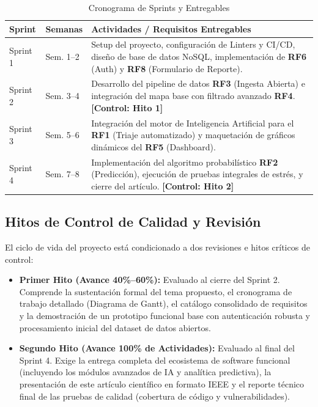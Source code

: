 \documentclass[conference]{IEEEtran}
\begin{document}
\begin{table}[htbp]
\caption{Cronograma de Sprints y Entregables}
\label{tab:cronograma}
\begin{center}
\begin{tabular}{llp{4.7cm}}
\toprule
\textbf{Sprint} & \textbf{Semanas} & \textbf{Actividades / Requisitos Entregables} \\ \midrule
Sprint 1 & Sem. 1--2 & Setup del proyecto, configuración de Linters y CI/CD, diseño de base de datos NoSQL, implementación de \textbf{RF6} (Auth) y \textbf{RF8} (Formulario de Reporte). \\ \addlinespace
Sprint 2 & Sem. 3--4 & Desarrollo del pipeline de datos \textbf{RF3} (Ingesta Abierta) e integración del mapa base con filtrado avanzado \textbf{RF4}. \textbf{[Control: Hito 1]} \\ \addlinespace
Sprint 3 & Sem. 5--6 & Integración del motor de Inteligencia Artificial para el \textbf{RF1} (Triaje automatizado) y maquetación de gráficos dinámicos del \textbf{RF5} (Dashboard). \\ \addlinespace
Sprint 4 & Sem. 7--8 & Implementación del algoritmo probabilístico \textbf{RF2} (Predicción), ejecución de pruebas integrales de estrés, y cierre del artículo. \textbf{[Control: Hito 2]} \\
\bottomrule
\end{tabular}
\end{center}
\end{table}

\subsection{Hitos de Control de Calidad y Revisión}
El ciclo de vida del proyecto está condicionado a dos revisiones e hitos críticos de control:
\begin{itemize}
    \item \textbf{Primer Hito (Avance 40\%--60\%):} Evaluado al cierre del Sprint 2. Comprende la sustentación formal del tema propuesto, el cronograma de trabajo detallado (Diagrama de Gantt), el catálogo consolidado de requisitos y la demostración de un prototipo funcional base con autenticación robusta y procesamiento inicial del dataset de datos abiertos.
    \item \textbf{Segundo Hito (Avance 100\% de Actividades):} Evaluado al final del Sprint 4. Exige la entrega completa del ecosistema de software funcional (incluyendo los módulos avanzados de IA y analítica predictiva), la presentación de este artículo científico en formato IEEE y el reporte técnico final de las pruebas de calidad (cobertura de código y vulnerabilidades).
\end{itemize}
\end{document}
